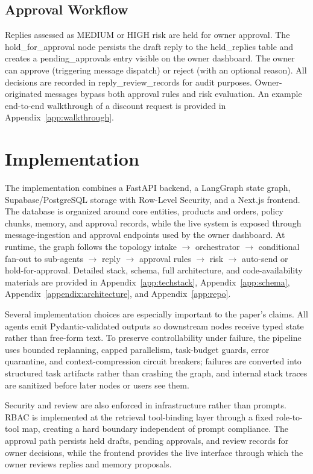 \documentclass[11pt]{article}
\begin{document}
\subsection{Approval Workflow}

Replies assessed as MEDIUM or HIGH risk are held for owner approval. The hold\_for\_approval node persists the draft reply to the held\_replies table and creates a pending\_approvals entry visible on the owner dashboard. The owner can approve (triggering message dispatch) or reject (with an optional reason). All decisions are recorded in reply\_review\_records for audit purposes. Owner-originated messages bypass both approval rules and risk evaluation. An example end-to-end walkthrough of a discount request is provided in Appendix~\ref{app:walkthrough}.

\section{Implementation}

The implementation combines a FastAPI backend, a LangGraph state graph, Supabase/PostgreSQL storage with Row-Level Security, and a Next.js frontend. The database is organized around core entities, products and orders, policy chunks, memory, and approval records, while the live system is exposed through message-ingestion and approval endpoints used by the owner dashboard. At runtime, the graph follows the topology intake $\rightarrow$ orchestrator $\rightarrow$ conditional fan-out to sub-agents $\rightarrow$ reply $\rightarrow$ approval rules $\rightarrow$ risk $\rightarrow$ auto-send or hold-for-approval. Detailed stack, schema, full architecture, and code-availability materials are provided in Appendix~\ref{app:techstack}, Appendix~\ref{app:schema}, Appendix~\ref{appendix:architecture}, and Appendix~\ref{app:repo}.

Several implementation choices are especially important to the paper's claims. All agents emit Pydantic-validated outputs so downstream nodes receive typed state rather than free-form text. To preserve controllability under failure, the pipeline uses bounded replanning, capped parallelism, task-budget guards, error quarantine, and context-compression circuit breakers; failures are converted into structured task artifacts rather than crashing the graph, and internal stack traces are sanitized before later nodes or users see them.

Security and review are also enforced in infrastructure rather than prompts. RBAC is implemented at the retrieval tool-binding layer through a fixed role-to-tool map, creating a hard boundary independent of prompt compliance. The approval path persists held drafts, pending approvals, and review records for owner decisions, while the frontend provides the live interface through which the owner reviews replies and memory proposals.
\end{document}
